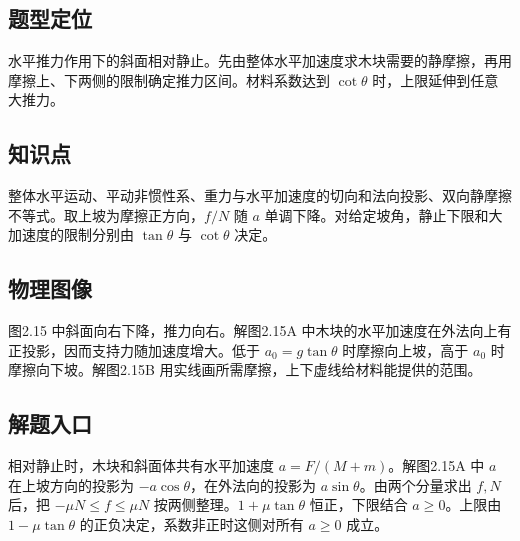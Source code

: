 \documentclass[UTF8,fontset=fandol,a4paper,11pt]{ctexart}
\begin{document}


\subsection*{题型定位}

水平推力作用下的斜面相对静止。先由整体水平加速度求木块需要的静摩擦，再用摩擦上、下两侧的限制确定推力区间。材料系数达到 $\cot\theta$ 时，上限延伸到任意大推力。



\subsection*{知识点}

整体水平运动、平动非惯性系、重力与水平加速度的切向和法向投影、双向静摩擦不等式。取上坡为摩擦正方向，$f/N$ 随 $a$ 单调下降。对给定坡角，静止下限和大加速度的限制分别由 $\tan\theta$ 与 $\cot\theta$ 决定。




\subsection*{物理图像}

图2.15 中斜面向右下降，推力向右。解图2.15A 中木块的水平加速度在外法向上有正投影，因而支持力随加速度增大。低于 $a_0=g\tan\theta$ 时摩擦向上坡，高于 $a_0$ 时摩擦向下坡。解图2.15B 用实线画所需摩擦，上下虚线给材料能提供的范围。



\subsection*{解题入口}

相对静止时，木块和斜面体共有水平加速度 $a=F/(M+m)$。解图2.15A 中 $a$ 在上坡方向的投影为 $-a\cos\theta$，在外法向的投影为 $a\sin\theta$。由两个分量求出 $f,N$ 后，把 $-\mu N\leq f\leq\mu N$ 按两侧整理。$1+\mu\tan\theta$ 恒正，下限结合 $a\geq0$。上限由 $1-\mu\tan\theta$ 的正负决定，系数非正时这侧对所有 $a\geq0$ 成立。


\end{document}
